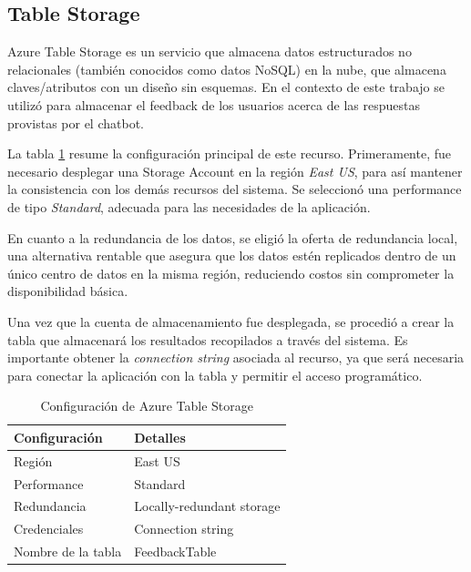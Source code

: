 \subsection{Table Storage}

Azure Table Storage es un servicio que almacena datos estructurados no relacionales (también conocidos como datos NoSQL) en la nube, que almacena claves/atributos 
con un diseño sin esquemas. En el contexto de este trabajo se utilizó para almacenar el feedback de los usuarios acerca de las respuestas provistas por el chatbot.

La tabla \ref{tab:config-table-storage} resume la configuración principal de este recurso. Primeramente, fue necesario desplegar una Storage Account en la región \textit{East US}, para así mantener la consistencia con los demás 
recursos del sistema. Se seleccionó una performance de tipo \textit{Standard}, adecuada para las necesidades de la aplicación.

En cuanto a la redundancia de los datos, se eligió la oferta de redundancia local, una alternativa rentable que asegura que los datos 
estén replicados dentro de un único centro de datos en la misma región, reduciendo costos sin comprometer la disponibilidad básica.

Una vez que la cuenta de almacenamiento fue desplegada, se procedió a crear la tabla que almacenará los resultados 
recopilados a través del sistema. Es importante obtener la \textit{connection string} asociada al recurso, ya que será 
necesaria para conectar la aplicación con la tabla y permitir el acceso programático. 

\begin{table}[h]
	\centering
	\caption[Configuración de Azure Table Storage]{Configuración de Azure Table Storage}
	\begin{tabular}{l l}    
		\toprule
		\textbf{Configuración} 	 & \textbf{Detalles} 	      \\
		\midrule
		Región                   &	East US 				  \\		
		Performance	             &  Standard				  \\
		Redundancia	             &  Locally-redundant storage \\
		Credenciales             &  Connection string         \\
		Nombre de la tabla       &	FeedbackTable             \\
		\bottomrule
		\hline
	\end{tabular}
	\label{tab:config-table-storage}
\end{table}

